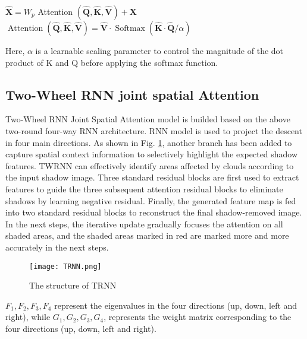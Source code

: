 \documentclass[journal]{IEEEtran}
\begin{document}
$\hat{\mathbf{X}}=W_{p}$ Attention $(\hat{\mathbf{Q}}, \hat{\mathbf{K}}, \hat{\mathbf{V}})+\mathbf{X}$
$\operatorname{Attention}(\hat{\mathbf{Q}}, \hat{\mathbf{K}}, \hat{\mathbf{V}})=\hat{\mathbf{V}} \cdot \operatorname{Softmax}(\hat{\mathbf{K}} \cdot \hat{\mathbf{Q}} / \alpha)$

Here, $\alpha$ is a learnable scaling parameter to control the magnitude of the dot product of K and Q before applying the softmax function.
\subsection{Two-Wheel RNN joint spatial Attention}
Two-Wheel RNN Joint Spatial Attention model is builded based on the above two-round four-way RNN architecture. RNN model is used to project the descent in four main directions. As shown in Fig. \ref{TRNN}, another branch has been added to capture spatial context information to selectively highlight the expected shadow features. TWRNN can effectively identify areas affected by clouds according to the input shadow image. Three standard residual blocks are first used to extract features to guide the three subsequent attention residual blocks to eliminate shadows by learning negative residual. Finally, the generated feature map is fed into two standard residual blocks to reconstruct the final shadow-removed image. In the next steps, the iterative update gradually focuses the attention on all shaded areas, and the shaded areas marked in red are marked more and more accurately in the next steps.

\begin{figure}
\centering
\texttt{[image: TRNN.png]}
\caption{The structure of TRNN}
\label{TRNN}
\end{figure}

$F_1,F_2,F_3,F_4$ represent the eigenvalues in the four directions (up, down, left and right), while $G_1,G_2,G_3,G_4$, represents the weight matrix corresponding to the four directions (up, down, left and right).
\end{document}
